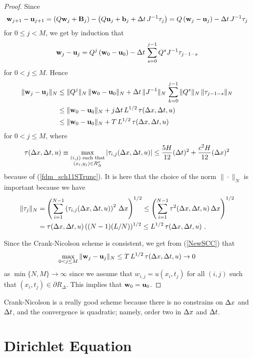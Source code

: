\begin{proof}
Since
\[
  \mathbf{w}_{j+1} - \mathbf{u}_{j+1}
=  \left( Q\mathbf{w}_j + \mathbf{B}_j \right)
- \left( Q \mathbf{u}_j + \mathbf{b}_j + \Delta{t}\,J^{-1} \mathbf{\tau}_j \right)
=  Q\left( \mathbf{w}_j - \mathbf{u}_j\right) - \Delta{t}\, J^{-1} \mathbf{\tau}_j
\]
for $0\leq j < M$, we get by induction that
\[
\mathbf{w}_j - \mathbf{u}_j
= Q^j\left( \mathbf{w}_0 - \mathbf{u}_0\right) -
\Delta{t}\, \sum_{s=0}^{j-1} Q^s J^{-1} \mathbf{\tau}_{j-1-s}
\]
for $0 < j \leq M$.  Hence
\begin{align}
\| \mathbf{w}_j - \mathbf{u}_j \|_N
&\leq \|Q^j\|_N\,\|\mathbf{w}_0 - \mathbf{u}_0\|_N
+ \Delta{t}\, \|J^{-1}\|_N \, \sum_{k=0}^{j-1} \|Q^s\|_N\, \|\mathbf{\tau}_{j-1-s}\|_N
\nonumber \\
& \leq \|\mathbf{w}_0 - \mathbf{u}_0\|_N
  + j \Delta{t} \, L^{1/2} \,\tau(\Delta{x},\Delta{t},u) \nonumber \\
&\leq \|\mathbf{w}_0 - \mathbf{u}_0\|_N
  + T \, L^{1/2} \,\tau(\Delta{x},\Delta{t},u) \label{NewSCC}
\end{align}
for $0 < j \leq M$, where
\[
\tau(\Delta{x},\Delta{t},u) \equiv
\max_{\substack{(i,j) \text{ such that}\\(x_i,y_j) \in R^o_\Delta}}
|\tau_{i,j}(\Delta{x},\Delta{t},u)|
\leq \frac{5H}{12} (\Delta{t})^2 + \frac{c^2 H}{12} (\Delta{x})^2
\]
because of (\ref{fdm_sch11STrunc}).  It is here that the choice of the
norm $\|\cdot\|_N$ is important because we have
\begin{align*}
\|\mathbf{\tau}_j\|_N 
&= \left(\sum_{i=1}^{N-1} \left(\tau_{i,j}(\Delta{x},\Delta{t},u)\right)^2\,
\Delta{x}\right)^{1/2}
\leq \left(\sum_{i=1}^{N-1} \tau^2(\Delta{x},\Delta{t},u)\,\Delta{x}\right)^{1/2} \\
&= \tau(\Delta{x},\Delta{t},u) \,
((N-1)(L/N))^{1/2} \leq L^{1/2}\, \tau(\Delta{x},\Delta{t},u) \ .
\end{align*}

Since the Crank-Nicolson scheme is consistent, we get from
(\ref{NewSCC}) that
\[
\max_{0<j\leq M} \| \mathbf{w}_j - \mathbf{u}_j \|_N
\leq T \, L^{1/2} \,\tau(\Delta{x},\Delta{t},u) \to 0
\]
as $\min\{N,M\} \to \infty$ since we assume that
$w_{i,j} = u(x_i,t_j)$ for all $(i,j)$ such that
$(x_i,t_j) \in \partial R_\Delta$.  This implies that
$\mathbf{w}_0 = \mathbf{u}_0$.
\end{proof}

Crank-Nicolson is a really good scheme because there is no constrains
on $\Delta{x}$ and $\Delta{t}$, and the convergence is quadratic; namely,
order two in $\Delta{x}$ and $\Delta{t}$.

\section{Dirichlet Equation} \label{CCSDirichlet}


